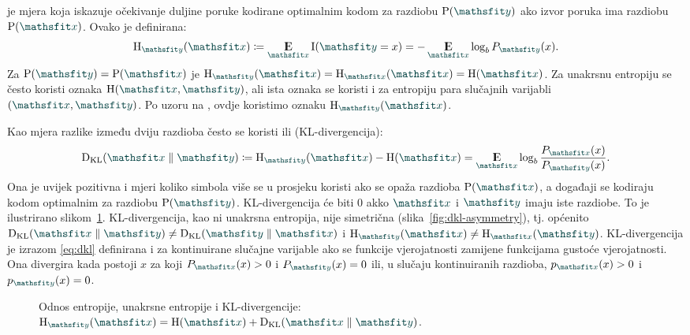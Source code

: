 \documentclass[utf8, diplomski, lmodern]{fer}
\begin{document}
 je mjera koja iskazuje očekivanje duljine poruke kodirane optimalnim kodom za razdiobu $\P(\rvar y)$ ako izvor poruka ima razdiobu $\P(\rvar x)$. Ovako je definirana:
\begin{align}
\H_{\rvar y}(\rvar x)\coloneqq \E_{\rvar x}\I(\rvar y=x) = -\E_{\rvar x}\log_b P_{\rvar y}(x) \text{.}
\end{align}
Za $\P(\rvar y) = \P(\rvar x)$ je $\H_{\rvar y}(\rvar x) = \H_{\rvar x}(\rvar x)=\H(\rvar x)$. Za unakrsnu entropiju se često koristi oznaka $\H(\rvar x,\rvar y)$, ali ista oznaka se koristi i za entropiju para slučajnih varijabli $(\rvar x,\rvar y)$. Po uzoru na \citet{Olah:2015:VIT}, ovdje koristimo oznaku $\H_{\rvar y}(\rvar x)$.

Kao mjera razlike između dviju razdioba često se koristi  ili  (KL-divergencija):
\begin{align}
	\Dkl{\rvar x}{\rvar y} \coloneqq \H_{\rvar y}(\rvar x) - \H(\rvar x) = \E_{\rvar x} \log_b\frac{P_{\rvar x}(x)}{P_{\rvar y}(x)} \text{.}
	\label{eq:dkl}
\end{align}
Ona je uvijek pozitivna i mjeri koliko simbola više se u prosjeku koristi ako se opaža razdioba $\P(\rvar x)$, a događaji se kodiraju kodom optimalnim za razdiobu $\P(\rvar y)$. KL-divergencija će biti $0$ akko $\rvar x$ i $\rvar y$ imaju iste razdiobe. To je ilustrirano slikom~\ref{fig:dkl}. KL-divergencija, kao ni unakrsna entropija, nije simetrična (slika~\ref{fig:dkl-asymmetry}), tj. općenito $\Dkl{\rvar x}{\rvar y}\neq\Dkl{\rvar y}{\rvar x}$ i $\H_{\rvar y}(\rvar x)\neq\H_{\rvar x}(\rvar y)$. KL-divergencija je izrazom \eqref{eq:dkl} definirana i za kontinuirane slučajne varijable ako se funkcije vjerojatnosti zamijene funkcijama gustoće vjerojatnosti. Ona divergira kada postoji $x$ za koji $P_{\rvar x}(x)>0$ i $P_{\rvar y}(x)=0$ ili, u slučaju kontinuiranih razdioba, $p_{\rvar x}(x)>0$ i $p_{\rvar y}(x)=0$.

\begin{figure}
	\centering
	\caption{Odnos entropije, unakrsne entropije i KL-divergencije: $\H_{\rvar y}(\rvar x)=\H(\rvar x)+\Dkl{\rvar x}{\rvar y}$.}
	\label{fig:dkl}
\end{figure}
\end{document}
